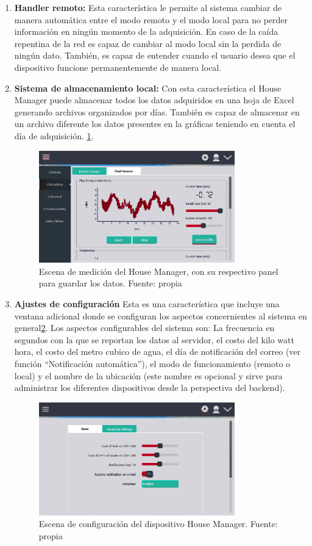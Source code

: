 \begin{enumerate}
	\item \textbf{Handler remoto:} Esta característica le permite al sistema cambiar de manera automática entre el modo remoto y el modo local para no perder información en ningún momento de la adquisición. En caso de la caída repentina de la red es capaz de cambiar al modo local sin la perdida de ningún dato. También, es capaz de entender cuando el usuario desea que el dispositivo funcione permanentemente de manera local.
	
	\item \textbf{Sistema de almacenamiento local:} Con esta característica el House Manager puede almacenar todos los datos adquiridos en una hoja de Excel generando archivos organizados por días. También es capaz de almacenar en un archivo diferente los datos presentes en la gráficas teniendo en cuenta el día de adquisición. \ref{fig_9}.
	\begin{figure}[htbp]
		\centerline{\includegraphics[width=8.5cm]{figuras/housemanager_measure.png}}
		\caption{Escena de medición del House Manager, con su respectivo panel para guardar los datos. Fuente: propia}
		\label{fig_9}
	\end{figure}

	\item \textbf{Ajustes de configuración} Esta es una característica que incluye una ventana adicional donde se configuran los aspectos concernientes al sistema en general\ref{fig_10}. Los aspectos configurables del sistema son: La frecuencia en segundos con la que se reportan los datos al servidor, el costo del kilo watt hora, el costo del metro cubico de agua, el día de notificación del correo (ver función ``Notificación automática''), el modo de funcionamiento (remoto o local) y el nombre de la ubicación (este nombre es opcional y sirve para administrar los diferentes dispositivos desde la perspectiva del backend).
	\begin{figure}[htbp]
		\centerline{\includegraphics[width=8.5cm]{figuras/housemanager_config.png}}
		\caption{Escena de configuración del dispositivo House Manager. Fuente: propia}
		\label{fig_10}
	\end{figure}


\end{enumerate}
